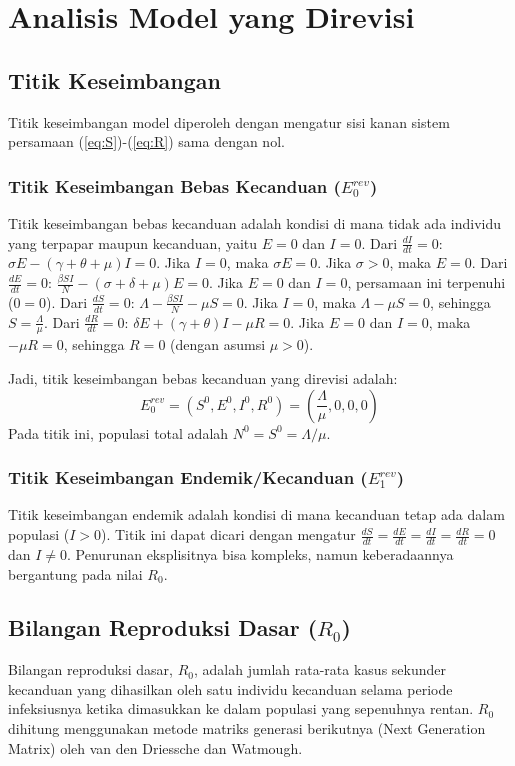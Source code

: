 \documentclass[12pt,a4paper]{article}
\begin{document}
\section{Analisis Model yang Direvisi}

\subsection{Titik Keseimbangan}
Titik keseimbangan model diperoleh dengan mengatur sisi kanan sistem persamaan (\ref{eq:S})-(\ref{eq:R}) sama dengan nol.

\subsubsection{Titik Keseimbangan Bebas Kecanduan ($E_0^{rev}$)}
Titik keseimbangan bebas kecanduan adalah kondisi di mana tidak ada individu yang terpapar maupun kecanduan, yaitu $E=0$ dan $I=0$.
Dari $\frac{dI}{dt} = 0$: $\sigma E - (\gamma + \theta + \mu)I = 0$. Jika $I=0$, maka $\sigma E = 0$. Jika $\sigma > 0$, maka $E=0$.
Dari $\frac{dE}{dt} = 0$: $\frac{\beta S I}{N} - (\sigma + \delta + \mu)E = 0$. Jika $E=0$ dan $I=0$, persamaan ini terpenuhi ($0=0$).
Dari $\frac{dS}{dt} = 0$: $\Lambda - \frac{\beta S I}{N} - \mu S = 0$. Jika $I=0$, maka $\Lambda - \mu S = 0$, sehingga $S = \frac{\Lambda}{\mu}$.
Dari $\frac{dR}{dt} = 0$: $\delta E + (\gamma + \theta)I - \mu R = 0$. Jika $E=0$ dan $I=0$, maka $-\mu R = 0$, sehingga $R=0$ (dengan asumsi $\mu > 0$).

Jadi, titik keseimbangan bebas kecanduan yang direvisi adalah:
$$ E_0^{rev} = (S^0, E^0, I^0, R^0) = \left(\frac{\Lambda}{\mu}, 0, 0, 0\right) $$
Pada titik ini, populasi total adalah $N^0 = S^0 = \Lambda/\mu$.

\subsubsection{Titik Keseimbangan Endemik/Kecanduan ($E_1^{rev}$)}
Titik keseimbangan endemik adalah kondisi di mana kecanduan tetap ada dalam populasi ($I > 0$). Titik ini dapat dicari dengan mengatur $\frac{dS}{dt}=\frac{dE}{dt}=\frac{dI}{dt}=\frac{dR}{dt}=0$ dan $I \neq 0$. Penurunan eksplisitnya bisa kompleks, namun keberadaannya bergantung pada nilai $R_0$.

\subsection{Bilangan Reproduksi Dasar ($R_0$)}
Bilangan reproduksi dasar, $R_0$, adalah jumlah rata-rata kasus sekunder kecanduan yang dihasilkan oleh satu individu kecanduan selama periode infeksiusnya ketika dimasukkan ke dalam populasi yang sepenuhnya rentan. $R_0$ dihitung menggunakan metode matriks generasi berikutnya (Next Generation Matrix) oleh van den Driessche dan Watmough.
\end{document}
